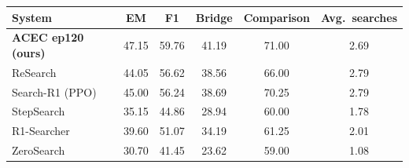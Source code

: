 \begin{tabular}{lccccc}
\toprule
System & EM & F1 & Bridge & Comparison & Avg.\ searches \\
\midrule
\textbf{ACEC ep120 (ours)} & 47.15 & 59.76 & 41.19 & 71.00 & 2.69 \\
ReSearch & 44.05 & 56.62 & 38.56 & 66.00 & 2.79 \\
Search-R1 (PPO) & 45.00 & 56.24 & 38.69 & 70.25 & 2.79 \\
StepSearch & 35.15 & 44.86 & 28.94 & 60.00 & 1.78 \\
R1-Searcher & 39.60 & 51.07 & 34.19 & 61.25 & 2.01 \\
ZeroSearch & 30.70 & 41.45 & 23.62 & 59.00 & 1.08 \\
\bottomrule
\end{tabular}

